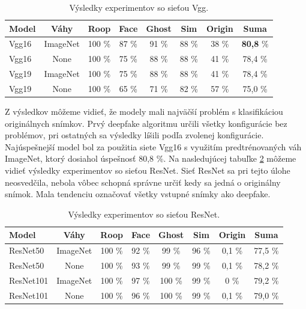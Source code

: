 \begin{table}[H]
\centering
\begin{tabular}{|l|c|c|c|c|c|c|c|}
\hline
\textbf{Model} & \textbf{Váhy} & \textbf{Roop} & \textbf{Face} & \textbf{Ghost} & \textbf{Sim} & \textbf{Origin} & \textbf{Suma}\\
\hline
Vgg16 & ImageNet & 100 \% & 87 \% & 91 \% & 88 \% & 38 \% & \textbf{80,8} \% \\
\hline
Vgg16 & None & 100 \% & 75 \% & 88 \% & 88 \% & 41 \% & 78,4 \% \\
\hline
Vgg19 & ImageNet & 100 \% & 75 \% & 88 \% & 88 \% & 41 \% & 78,4 \% \\
\hline
Vgg19 & None & 100 \% & 65 \% & 71 \% & 82 \% & 57 \% & 75,0 \% \\
\hline
\end{tabular}
\caption{Výsledky experimentov so sieťou Vgg.}
\label{tab:vgg_results}
\end{table}

Z výsledkov môžeme vidieť, že modely mali najväčší problém s klasifikáciou originálnych snímkov. Prvý deepfake algoritmu určili všetky konfigurácie bez problémov, pri ostatných sa výsledky líšili podľa zvolenej konfigurácie. Najúspešnejší model bol za použitia siete Vgg16 s využitím predtrénovaných váh ImageNet, ktorý dosiahol úspešnosť 80,8 \%. Na nasledujúcej tabuľke \ref{tab:resnet_results} môžeme vidieť výsledky experimentov so sieťou ResNet. Sieť ResNet sa pri tejto úlohe neosvedčila, nebola vôbec schopná správne určiť kedy sa jedná o originálny snímok. Mala tendenciu označovať všetky vstupné snímky ako deepfake.

\begin{table}[H]
\centering
\begin{tabular}{|l|c|c|c|c|c|c|c|}
\hline
\textbf{Model} & \textbf{Váhy} & \textbf{Roop} & \textbf{Face} & \textbf{Ghost} & \textbf{Sim} & \textbf{Origin} & \textbf{Suma}\\
\hline
ResNet50 & ImageNet & 100 \% & 92 \% & 99 \% & 96 \% & 0,1 \% & 77,5 \% \\
\hline
ResNet50 & None & 100 \% & 93 \% & 99 \% & 99 \% & 0,1 \% & 78,2 \% \\
\hline
ResNet101 & ImageNet & 100 \% & 97 \% & 100 \% & 99 \% & 0 \% & 79,2 \% \\
\hline
ResNet101 & None & 100 \% & 96 \% & 100 \% & 99 \% & 0,1 \% & 79,0 \% \\
\hline
\end{tabular}
\caption{Výsledky experimentov so sieťou ResNet.}
\label{tab:resnet_results}
\end{table}

